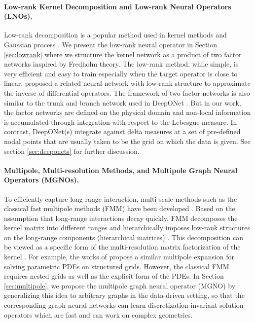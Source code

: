 \paragraph{Low-rank Kernel Decomposition and Low-rank Neural Operators (LNOs).}
Low-rank decomposition is a popular method used in kernel methods and Gaussian process
\citep{kulis2006learning, bach2013sharp, lan2017low, gardner2018product}.
We present the low-rank neural operator in Section \ref{sec:lowrank} where we structure the kernel network as a product of two factor networks inspired by Fredholm theory. The low-rank method, while simple, is very efficient and easy to train especially when the target operator is close to linear.
\citet{khoo2019switchnet} proposed a related neural network with low-rank structure to approximate the inverse of differential operators.
The framework of two factor networks is also similar to the trunk and branch network used in DeepONet \citep{lu2019deeponet}. But in our work, the factor networks are defined on the physical domain and non-local information is accumulated through integration with respect to the Lebesgue measure. 
In contrast, DeepONet(s) integrate against delta measures at a set of pre-defined nodal points that are usually taken to be the grid on which the data is given. See section \ref{sec:deeponets} for further discussion.

\paragraph{Multipole, Multi-resolution Methods, and Multipole Graph Neural Operators (MGNOs).}
To efficiently capture long-range interaction,   multi-scale methods such as the classical fast multipole methods (FMM) have been developed \citep{greengard1997new}. Based on the assumption that long-range interactions decay quickly, FMM decomposes the kernel matrix into different ranges and hierarchically imposes low-rank structures on the long-range components (hierarchical matrices) \citep{borm2003hierarchical}. This decomposition can be viewed as a specific form of the multi-resolution matrix factorization of the kernel \citep{kondor2014multiresolution, borm2003hierarchical}.
For example, the works of \citet{fan2019multiscale,fan2019multiscale2, he2019mgnet} propose a similar multipole expansion for solving parametric PDEs on structured grids.  
However, the classical FMM requires nested grids as well as the explicit form of the PDEs. In Section \ref{sec:multipole}, 
we propose the multipole graph neural operator (MGNO) by generalizing this idea to arbitrary graphs in the data-driven setting, so that the corresponding graph neural networks can learn discretization-invariant solution operators which are fast and can work on complex geometries.



